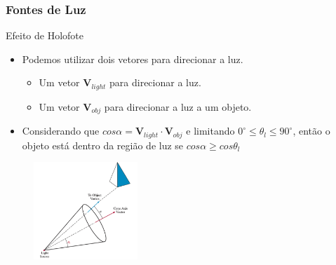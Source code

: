 \documentclass{beamer}
\begin{document}
\begin{frame}
\frametitle{Fontes de Luz}

	\begin{block}{Efeito de Holofote}
		\begin{itemize}
			\item Podemos utilizar dois vetores para direcionar a luz.
			\begin{itemize}
				\item Um vetor $\textbf{V}_{light}$ para direcionar a luz.
				\item Um vetor $\textbf{V}_{obj}$ para direcionar a luz a um objeto.
			\end{itemize}
			\item Considerando que $cos \alpha = \textbf{V}_{light} \cdot \textbf{V}_{obj}$ e limitando $0^\circ \leq \theta_l \leq 90^\circ$, então o objeto está dentro da região de luz se $cos \alpha \geq cos \theta_l$				 
		\end{itemize}
	\end{block}

	\begin{figure}[!h]
			\begin{center}
			\includegraphics[width=0.35\textwidth]{Figures/OloVec}
			\end{center}
	\end{figure}	
	
\end{frame}
\end{document}
